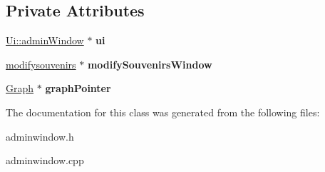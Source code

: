 \subsection*{Private Attributes}
\begin{DoxyCompactItemize}
\item 
\mbox{\label{classadmin_window_a0588ac6ffce4f1564831df57a6fde502}} 
\hyperlink{class_ui_1_1admin_window}{Ui\+::admin\+Window} $\ast$ {\bfseries ui}
\item 
\mbox{\label{classadmin_window_a70c04791ef7eed9cd56feb4bde28112a}} 
\hyperlink{classmodifysouvenirs}{modifysouvenirs} $\ast$ {\bfseries modify\+Souvenirs\+Window}
\item 
\mbox{\label{classadmin_window_a937bdf631bf80712039ef52bb89159ea}} 
\hyperlink{class_graph}{Graph} $\ast$ {\bfseries graph\+Pointer}
\end{DoxyCompactItemize}


The documentation for this class was generated from the following files\+:\begin{DoxyCompactItemize}
\item 
adminwindow.\+h\item 
adminwindow.\+cpp\end{DoxyCompactItemize}
